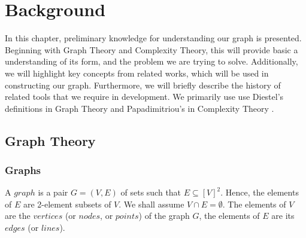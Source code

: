 
\chapter{Background}

\ifpdf
    \graphicspath{{Chapter2/Figs/Raster/}{Chapter2/Figs/PDF/}{Chapter2/Figs/}}
\else
    \graphicspath{{Chapter2/Figs/Vector/}{Chapter2/Figs/}}
\fi

In this chapter, preliminary knowledge for understanding our graph is presented. Beginning with Graph Theory and Complexity Theory, this will provide basic a understanding of its form, and the problem we are trying to solve. Additionally, we will highlight key concepts from related works, which will be used in constructing our graph. Furthermore, we will briefly describe the history of related tools that we require in development. We primarily use use Diestel's definitions in Graph Theory and Papadimitriou's in Complexity Theory \cite{diestel2005graph}\cite{papadimitriou2003computational}.

\section[Graph Theory]{Graph Theory}

\subsection{Graphs}
A $graph$ is a pair $G=(V,E)$ of sets such that $E\subseteq[V]^{2}$. Hence, the elements of $E$ are 2-element subsets of $V$. We shall assume $V{\cap}E=\emptyset$. The elements of $V$ are the $vertices$ (or $nodes$, or $points$) of the graph $G$, the elements of $E$ are its $edges$ (or $lines$). 

